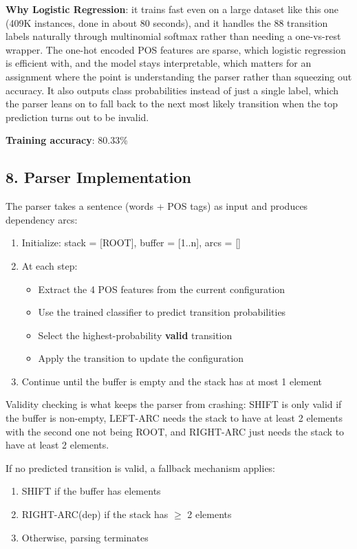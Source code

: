 \documentclass[11pt,a4paper]{article}
\begin{document}
\textbf{Why Logistic Regression}: it trains fast even on a large dataset like this one (409K instances, done in about 80 seconds), and it handles the 88 transition labels naturally through multinomial softmax rather than needing a one-vs-rest wrapper. The one-hot encoded POS features are sparse, which logistic regression is efficient with, and the model stays interpretable, which matters for an assignment where the point is understanding the parser rather than squeezing out accuracy. It also outputs class probabilities instead of just a single label, which the parser leans on to fall back to the next most likely transition when the top prediction turns out to be invalid.

\textbf{Training accuracy}: 80.33\%

\subsection*{8. Parser Implementation}

The parser takes a sentence (words + POS tags) as input and produces dependency arcs:

\begin{enumerate}
\item Initialize: stack = [ROOT], buffer = [1..n], arcs = []
\item At each step:
\begin{itemize}
\item Extract the 4 POS features from the current configuration
\item Use the trained classifier to predict transition probabilities
\item Select the highest-probability \textbf{valid} transition
\item Apply the transition to update the configuration
\end{itemize}
\item Continue until the buffer is empty and the stack has at most 1 element
\end{enumerate}

Validity checking is what keeps the parser from crashing: SHIFT is only valid if the buffer is non-empty, LEFT-ARC needs the stack to have at least 2 elements with the second one not being ROOT, and RIGHT-ARC just needs the stack to have at least 2 elements.

If no predicted transition is valid, a fallback mechanism applies:

\begin{enumerate}
\item SHIFT if the buffer has elements
\item RIGHT-ARC(dep) if the stack has $\geq$ 2 elements
\item Otherwise, parsing terminates
\end{enumerate}
\end{document}

